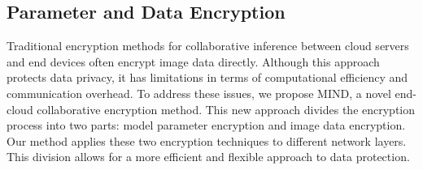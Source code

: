 \documentclass[conference]{IEEEtran}
\begin{document}


 \subsection{Parameter and Data Encryption}
Traditional encryption methods for collaborative inference between cloud servers and end devices often encrypt image data directly. Although this approach protects data privacy, it has limitations in terms of computational efficiency and communication overhead. To address these issues, we propose MIND, a novel end-cloud collaborative encryption method. This new approach divides the encryption process into two parts: model parameter encryption and image data encryption. Our method applies these two encryption techniques to different network layers. This division allows for a more efficient and flexible approach to data protection.
\end{document}
